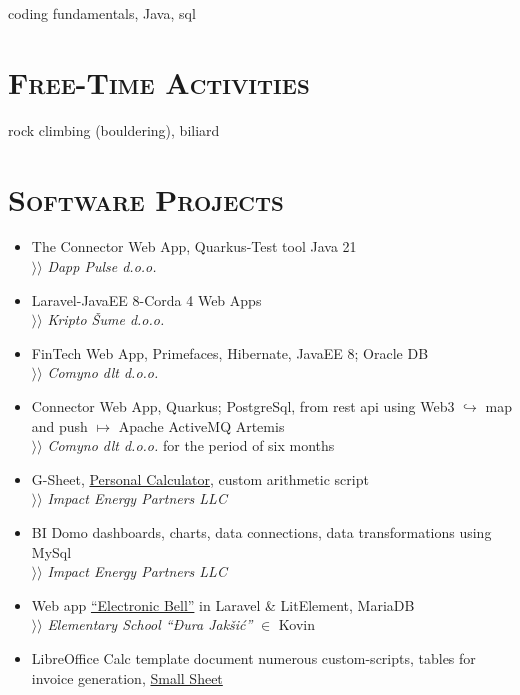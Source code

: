 \documentclass[12pt]{article}
\begin{document}
    coding fundamentals, Java, sql

\section{\textsc{Free-Time Activities}}

    rock climbing (bouldering), biliard

\pagebreak

\section{\textsc{Software Projects}}

\begin{itemize}[parsep=1.5pt]
\item The Connector Web App, Quarkus-Test tool Java 21 \\
    $\rangle\!\rangle$ \textit{Dapp Pulse d.o.o.}
\item  Laravel-JavaEE 8-Corda 4 Web Apps \\
    $\rangle\!\rangle$ \textit{Kripto Šume d.o.o.}
\item FinTech Web App, Primefaces, Hibernate, JavaEE 8; Oracle DB \\
    $\rangle\!\rangle$ \textit{Comyno dlt d.o.o.}
\item Connector Web App, Quarkus; PostgreSql, from rest api using Web3 $\hookrightarrow$ map and push $\mapsto$ Apache ActiveMQ Artemis \\
    $\rangle\!\rangle$ \textit{Comyno dlt d.o.o.} for the period of six months
\item G-Sheet, \href{https://docs.google.com/spreadsheets/d/1ztJoonmA0d0AyNDwVE1vnjpOPPpM03JF1eWCHwfQ4ZA/edit?usp=sharing}{Personal Calculator}, custom arithmetic script \\
    $\rangle\!\rangle$ \textit{Impact Energy Partners LLC}
\item BI Domo dashboards, charts, data connections, data transformations using MySql \\
    $\rangle\!\rangle$ \textit{Impact Energy Partners LLC}
\item Web app \href{https://zvono.nastavnikinformatike.com}{``Electronic Bell''} in Laravel \& LitElement, MariaDB \\
    $\rangle\!\rangle$ \textit{Elementary School ``Đura Jakšić''} $\in$ Kovin
\item LibreOffice Calc template document numerous custom-scripts, tables for invoice generation, \href{https://docs.google.com/spreadsheets/d/1Hh9O7KoN8RETCPzJl5zVYV3CQdjvu2Qtbiu3tu5O9LY/edit?usp=sharing}{Small Sheet} \\ 

\end{itemize}
\end{document}
